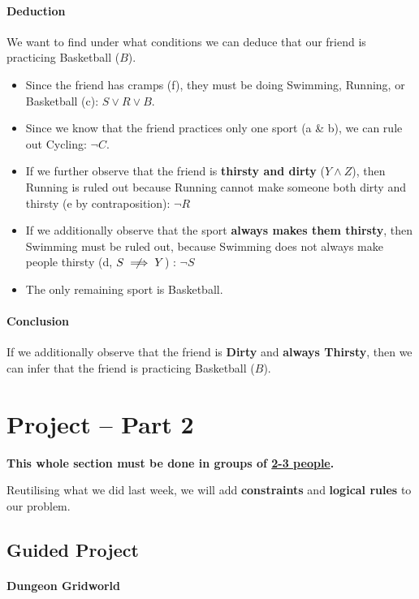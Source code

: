 \documentclass[11pt]{article}
\numberwithin{equation}{section}
\begin{document}
\begin{enumerate}
{\paragraph{Deduction}
We want to find under what conditions we can deduce that our friend is practicing Basketball ($B$).
\begin{itemize}
    \item Since the friend has cramps (f), they must be doing Swimming, Running, or Basketball (c): $S \lor R \lor B$.
    \item Since we know that the friend practices only one sport (a \& b), we can rule out Cycling: $\neg C$.
    \item If we further observe that the friend is \textbf{thirsty and dirty} ($Y \land Z$), then Running is ruled out because Running cannot make someone both dirty and thirsty (e by contraposition): $\neg R$
    \item If we additionally observe that the sport \textbf{always makes them thirsty}, then Swimming must be ruled out, because Swimming does not always make people thirsty (d, $S \centernot\implies Y$) : $\neg S$
    \item The only remaining sport is Basketball.
\end{itemize}

\paragraph{Conclusion}
If we additionally observe that the friend is \textbf{Dirty} and \textbf{always Thirsty}, then we can infer that the friend is practicing Basketball ($B$). 
    } 

\end{enumerate}

\section*{\textbf{Project -- Part 2}}

\textbf{This whole section must be done in groups of \underline{2-3 people}.}
\smallskip

Reutilising what we did last week, we will add \textbf{constraints} and \textbf{logical rules} to our problem.

\subsection{Guided Project}

\paragraph{Dungeon Gridworld}
\end{document}
